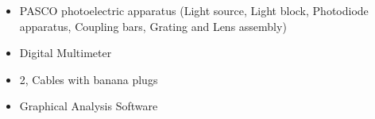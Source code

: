\begin{itemize}
    \item {PASCO photoelectric apparatus (Light source, Light block, Photodiode apparatus,
Coupling bars, Grating and Lens assembly)}
    \item {Digital Multimeter}
    \item {2, Cables with banana plugs}
    \item {Graphical Analysis Software}
    \label{mat}
\end{itemize}


